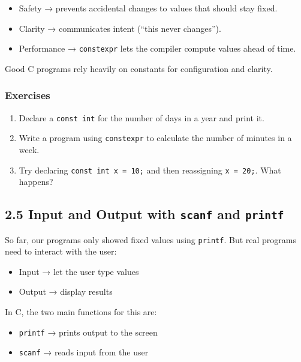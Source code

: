 \documentclass[
  letterpaper,
  DIV=11,
  numbers=noendperiod]{scrreprt}
\providecommand{\tightlist}{%
  \setlength{\itemsep}{0pt}\setlength{\parskip}{0pt}}
\begin{document}
\begin{itemize}
\tightlist
\item
  Safety → prevents accidental changes to values that should stay fixed.
\item
  Clarity → communicates intent (``this never changes'').
\item
  Performance → \texttt{constexpr} lets the compiler compute values
  ahead of time.
\end{itemize}

Good C programs rely heavily on constants for configuration and clarity.

\subsubsection{Exercises}\label{exercises-8}

\begin{enumerate}
\def\labelenumi{\arabic{enumi}.}
\tightlist
\item
  Declare a \texttt{const\ int} for the number of days in a year and
  print it.
\item
  Write a program using \texttt{constexpr} to calculate the number of
  minutes in a week.
\item
  Try declaring \texttt{const\ int\ x\ =\ 10;} and then reassigning
  \texttt{x\ =\ 20;}. What happens?
\end{enumerate}

\subsection{\texorpdfstring{2.5 Input and Output with \texttt{scanf} and
\texttt{printf}}{2.5 Input and Output with scanf and printf}}\label{input-and-output-with-scanf-and-printf}

So far, our programs only showed fixed values using \texttt{printf}. But
real programs need to interact with the user:

\begin{itemize}
\tightlist
\item
  Input → let the user type values
\item
  Output → display results
\end{itemize}

In C, the two main functions for this are:

\begin{itemize}
\tightlist
\item
  \texttt{printf} → prints output to the screen
\item
  \texttt{scanf} → reads input from the user
\end{itemize}
\end{document}
